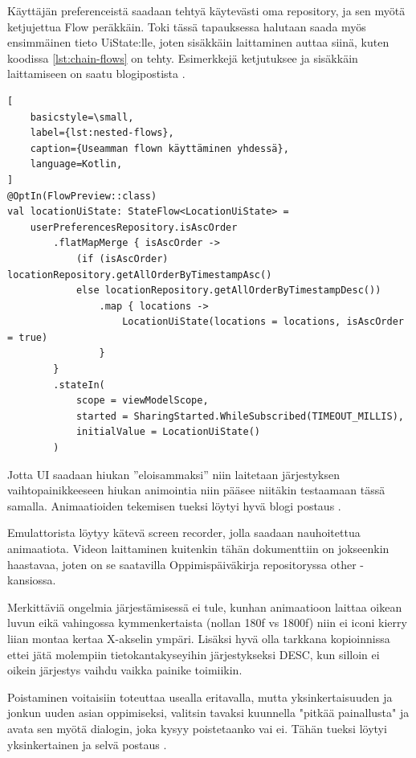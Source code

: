 Käyttäjän preferenceistä saadaan tehtyä käytevästi oma repository, ja sen myötä
ketjujettua Flow peräkkäin. Toki tässä tapauksessa halutaan saada myös
ensimmäinen tieto UiState:lle, joten sisäkkäin laittaminen auttaa siinä, kuten
koodissa \ref{lst:chain-flows} on tehty. Esimerkkejä ketjutuksee ja sisäkkäin
laittamiseen on saatu blogipostista \parencite{KotlinFlowNestingVSChaining}.

\begin{lstlisting}[
    basicstyle=\small,
    label={lst:nested-flows},
    caption={Useamman flown käyttäminen yhdessä},
    language=Kotlin,
]
@OptIn(FlowPreview::class)
val locationUiState: StateFlow<LocationUiState> =
    userPreferencesRepository.isAscOrder
        .flatMapMerge { isAscOrder ->
            (if (isAscOrder) locationRepository.getAllOrderByTimestampAsc()
            else locationRepository.getAllOrderByTimestampDesc())
                .map { locations ->
                    LocationUiState(locations = locations, isAscOrder = true)
                }
        }
        .stateIn(
            scope = viewModelScope,
            started = SharingStarted.WhileSubscribed(TIMEOUT_MILLIS),
            initialValue = LocationUiState()
        )
\end{lstlisting}

Jotta UI saadaan hiukan ''eloisammaksi'' niin laitetaan järjestyksen
vaihtopainikkeeseen hiukan animointia niin pääsee niitäkin testaamaan tässä
samalla. Animaatioiden tekemisen tueksi löytyi hyvä blogi postaus
\parencite{CardFlipAnimationWithJetpackCompose}.

Emulattorista löytyy kätevä screen recorder, jolla saadaan nauhoitettua
animaatiota. Videon laittaminen kuitenkin tähän dokumenttiin on jokseenkin
haastavaa, joten on se saatavilla Oppimispäiväkirja repositoryssa other
-kansiossa.

Merkittäviä ongelmia järjestämisessä ei tule, kunhan animaatioon laittaa oikean
luvun eikä vahingossa kymmenkertaista (nollan 180f vs 1800f) niin ei iconi
kierry liian montaa kertaa X-akselin ympäri. Lisäksi hyvä olla tarkkana
kopioinnissa ettei jätä molempiin tietokantakyseyihin järjestykseksi DESC, kun
silloin ei oikein järjestys vaihdu vaikka painike toimiikin.

Poistaminen voitaisiin toteuttaa usealla eritavalla, mutta yksinkertaisuuden ja
jonkun uuden asian oppimiseksi, valitsin tavaksi kuunnella "pitkää painallusta"
ja avata sen myötä dialogin, joka kysyy poistetaanko vai ei. Tähän tueksi
löytyi yksinkertainen ja selvä postaus \parencite{DevelopersMemoLongPress}.

